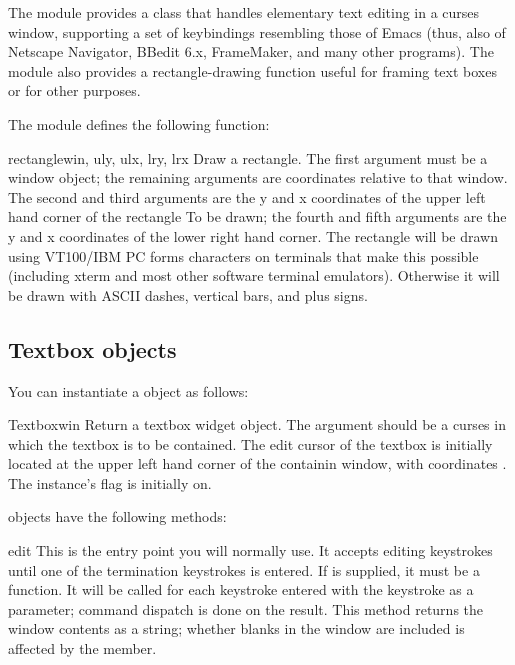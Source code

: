 
The  module provides a  class
that handles elementary text editing in a curses window, supporting a
set of keybindings resembling those of Emacs (thus, also of Netscape
Navigator, BBedit 6.x, FrameMaker, and many other programs).  The
module also provides a rectangle-drawing function useful for framing
text boxes or for other purposes.

The module  defines the following function:

\begin{funcdesc}{rectangle}{win, uly, ulx, lry, lrx}
Draw a rectangle.  The first argument must be a window object; the
remaining arguments are coordinates relative to that window.  The
second and third arguments are the y and x coordinates of the upper
left hand corner of the rectangle To be drawn; the fourth and fifth
arguments are the y and x coordinates of the lower right hand corner.
The rectangle will be drawn using VT100/IBM PC forms characters on
terminals that make this possible (including xterm and most other
software terminal emulators).  Otherwise it will be drawn with ASCII 
dashes, vertical bars, and plus signs.
\end{funcdesc}


\subsection{Textbox objects \label{curses-textpad-objects}}

You can instantiate a  object as follows:

\begin{classdesc}{Textbox}{win}
Return a textbox widget object.  The  argument should be a
curses  in which the textbox is to be contained.
The edit cursor of the textbox is initially located at the upper left
hand corner of the containin window, with coordinates .
The instance's  flag is initially on.
\end{classdesc}

 objects have the following methods:

\begin{methoddesc}{edit}{}
This is the entry point you will normally use.  It accepts editing
keystrokes until one of the termination keystrokes is entered.  If
 is supplied, it must be a function.  It will be called
for each keystroke entered with the keystroke as a parameter; command
dispatch is done on the result. This method returns the window
contents as a string; whether blanks in the window are included is
affected by the  member.
\end{methoddesc}

